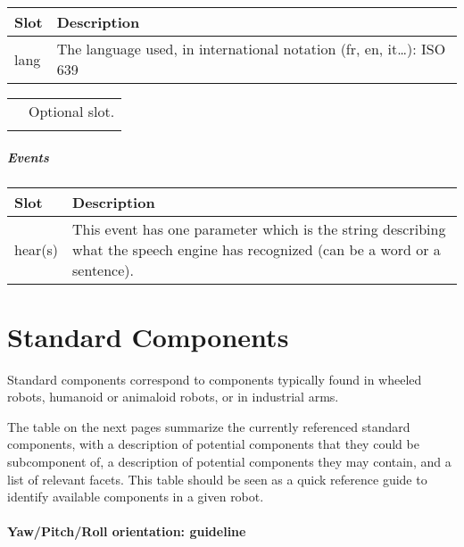 \documentclass[a4paper]{article}
\begin{document}
\begin{flushleft}
\tablehead{}
\begin{supertabular}{|m{3.293cm}|m{11.997cm}|}
\hline
\sffamily\bfseries Slot &
\sffamily\bfseries Description\\\hline
lang &
\sffamily The language used, in international
notation (fr, en, it…): ISO 639\\\hline
\end{supertabular}
\end{flushleft}
\begin{flushleft}
\tablehead{}
\begin{supertabular}{|m{1.717cm}|m{10.464cm}}
\hhline{-~}
 &
\sffamily Optional slot.\\\hhline{-~}
\end{supertabular}
\end{flushleft}
\subparagraph{Events}

\begin{flushleft}
\tablehead{}
\begin{supertabular}{|m{3.293cm}|m{11.997cm}|}
\hline
\sffamily\bfseries Slot &
\sffamily\bfseries Description\\\hline
hear(s) &
\sffamily This event has one parameter which is
the string describing what the speech engine has recognized (can be a
word or a sentence).\\\hline
\end{supertabular}
\end{flushleft}
\section[Standard Components]{Standard
Components}

Standard components correspond to components typically found in wheeled
robots, humanoid or animaloid robots, or in industrial arms.


The table on the next pages summarize the currently referenced standard
components, with a description of potential components that they could
be subcomponent of, a description of potential components they may
contain, and a list of relevant facets. This table should be seen as a
quick reference guide to identify available components in a given
robot.

\paragraph{Yaw/Pitch/Roll orientation: guideline}
\end{document}
